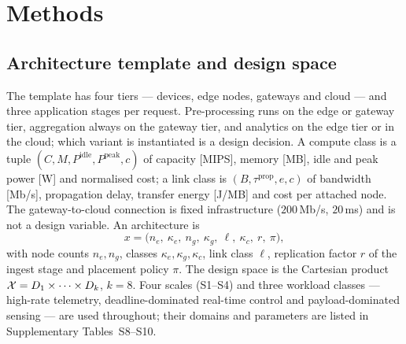 \section{Methods}
\label{sec:sn:methods}

\subsection{Architecture template and design space}
The template has four tiers --- devices, edge nodes, gateways and cloud --- and three
application stages per request. Pre-processing runs on the edge or gateway tier,
aggregation always on the gateway tier, and analytics on the edge tier or in the cloud;
which variant is instantiated is a design decision. A compute class is a tuple
$(C,M,P^{\mathrm{idle}},P^{\mathrm{peak}},c)$ of capacity [MIPS], memory [MB], idle and
peak power [W] and normalised cost; a link class is $(B,\tau^{\mathrm{prop}},e,c)$ of
bandwidth [Mb/s], propagation delay, transfer energy [J/MB] and cost per attached node.
The gateway-to-cloud connection is fixed infrastructure ($200$\,Mb/s, $20$\,ms) and is
not a design variable. An architecture is
\begin{equation}
x=\big(n_e,\ \kappa_e,\ n_g,\ \kappa_g,\ \ell,\ \kappa_c,\ r,\ \pi\big),
\label{eq:ce:decision}
\end{equation}
with node counts $n_e,n_g$, classes $\kappa_e,\kappa_g,\kappa_c$, link class $\ell$,
replication factor $r$ of the ingest stage and placement policy $\pi$. The design space is
the Cartesian product $\mathcal{X}=D_1\times\dots\times D_k$, $k=8$. Four scales
(S1--S4) and three workload classes --- high-rate telemetry, deadline-dominated real-time
control and payload-dominated sensing --- are used throughout; their domains and
parameters are listed in Supplementary Tables~S8--S10.

